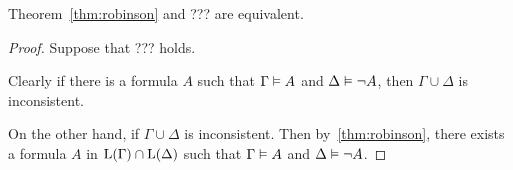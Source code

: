 \begin{prop}
	Theorem~\ref{thm:robinson} and ??? are equivalent.
\end{prop}
\begin{proof}
	Suppose that ??? holds.

	Clearly if there is a formula $A$ such that $\Gamma\vDash A$ and $\Delta\vDash \lnot A$, then $\Gamma \cup \Delta $ is inconsistent.

	On the other hand, if $\Gamma\cup\Delta$ is inconsistent. 
	Then by~\ref{thm:robinson}, there exists a formula $A$ in $\operatorname{L}(\Gamma)\cap\operatorname{L}(\Delta)$ such that $\Gamma \vDash A$ and $\Delta \vDash \lnot A$. 


\end{proof}




